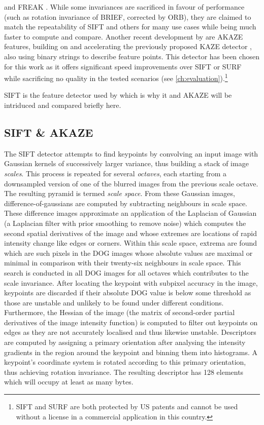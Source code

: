 \citep[Oriented BRIEF]{rublee2011} and FREAK \citep[Fast Retina
Keypoint]{ortiz2012}. While some invariances are sacrificed in favour of
performance (such as rotation invariance of BRIEF, corrected by ORB), they are
claimed to match the repeatability of SIFT and others for many use cases while
being much faster to compute and compare. Another recent development by
\citet{alcantarilla2013} are AKAZE features, building on and accelerating the
previously proposed KAZE detector \citep{alcantarilla2012}, also using binary
strings to describe feature points. This detector has been chosen for this work
as it offers significant speed improvements over SIFT or SURF while sacrificing
no quality in the tested scenarios (see \autoref{ch:evaluation}).\footnote{SIFT
and SURF are both protected by US patents and cannot be used without a license
in a commercial application in this country.}

SIFT is the feature detector used by \citet{bae2010} which is why it and AKAZE
will be intriduced and compared briefly here.

\subsection{SIFT \& AKAZE}\label{subsec:sift_akaze}

The SIFT detector attempts to find keypoints by convolving an input image with
Gaussian kernels of successively larger variance, thus building a stack of image
\emph{scales}. This process is repeated for several \emph{octaves}, each starting
from a downsampled version of one of the blurred images from the previous scale
octave. The resulting pyramid is termed \emph{scale space}.  From these Gaussian
images, difference-of-gaussians are computed by subtracting neighbours in scale
space. These difference images approximate an application of the Laplacian of
Gaussian (a Laplacian filter with prior smoothing to remove noise) which computes
the second spatial derivatives of the image and whose extremes are locations of
rapid intensity change like edges or corners. Within this scale space, extrema
are found which are such pixels in the DOG images whose absolute values are
maximal or minimal in comparison with their twenty-six neighbours in scale
space. This search is conducted in all DOG images for all octaves which
contributes to the scale invariance. After locating the keypoint with subpixel
accuracy in the image, keypoints are discarded if their absolute DOG value is
below some threshold as those are unstable and unlikely to be found under
different conditions. Furthermore, the Hessian of the
image (the matrix of second-order partial derivatives of the image intensity
function) is computed to filter out keypoints on edges as they are not accurately
localised and thus likewise unstable. Descriptors are computed by assigning a
primary orientation after analysing the intensity gradients in the region around the
keypoint and binning them into histograms. A keypoint's coordinate system is
rotated according to this primary orientation, thus achieving rotation
invariance. The resulting descriptor has 128 elements which will occupy at least
as many bytes.

